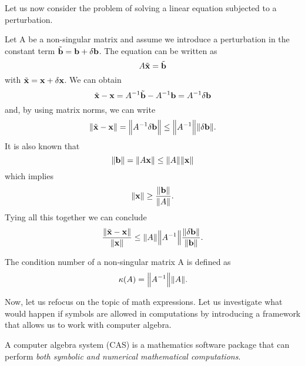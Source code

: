 Let us now consider the problem of solving a linear equation subjected to a perturbation.

Let A be a non-singular matrix and assume we introduce a perturbation in the constant term
\(\tilde{\vb{b}} = \vb{b} +  \delta \vb{b}\). The equation can be written as
\[
    A\tilde{\vb{x}} = \tilde{\vb{b}}
\]
with \(\tilde{\vb{x}} = \vb{x} + \delta \vb{x}\). We can obtain
\[
    \tilde{\vb{x}} - \vb{x} = A^{-1} \tilde{\vb{b}} - A^{-1} \vb{b} = A^{-1} \delta \vb{b}
\]
and, by using matrix norms, we can write
\[
    \norm{\tilde{\vb{x}} - \vb{x}} = \norm{A^{-1} \delta \vb{b}} \leq \norm{A^{-1}} \norm{\delta \vb{b}}.
\]
It is also known that
\[
    \norm{\vb{b}} = \norm{A \vb{x}} \leq \norm{A} \norm{\vb{x}}
\]
which implies
\[
    \norm{\vb{x}} \geq \dfrac{\norm{\vb{b}}}{\norm{A}}.
\]
Tying all this together we can conclude
\[
    \dfrac{\norm{\tilde{\vb{x}} - \vb{x}}}{\norm{\vb{x}}} \leq \norm{A} \norm{A^{-1}}
    \dfrac{\norm{\delta \vb{b}}}{\norm{\vb{b}}}.
\]

\begin{definition}\cite[p. 36]{numerical-mathematics}
    The condition number of a non-singular matrix A is defined as
    \[
        \kappa(A) = \norm{A^{-1}} \norm{A}.
    \]
\end{definition}

Now, let us refocus on the topic of math expressions.
Let us investigate what would happen if symbols are allowed in computations by introducing a framework that allows
us to work with computer algebra.
\begin{definition}
    A computer algebra system (CAS) is a mathematics software package that can perform \textit{both symbolic and numerical
    mathematical computations}.
\end{definition}

